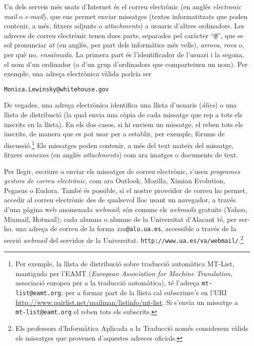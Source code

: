 Un dels serveis més usats d'Internet és el correu
electrònic (en anglés \emph{electronic mail} o \emph{e-mail}),
que ens permet enviar missatges (textos informatitzats que poden
contenir, a més, fitxers adjunts o \emph{attachments}) a usuaris
d'altres ordinadors.  Les adreces de correu electrònic tenen dues
parts, separades pel caràcter ``{\tt @}'', que se sol pronunciar
\emph{at} (en anglés, per part dels informátics més vells), {\em
  arrova}, \emph{rova} o, per què no, \emph{ensa\"{\i}mada}. La
primera part és l'identificador de l'usuari i la segona, el nom
d'un ordinador (o d'un grup d'ordinadors que comparteixen un nom). Per
exemple, una adreça electrònica vàlida podria ser
\begin{center}
{\tt Monica.Lewinsky@whitehouse.gov}
\end{center}
De vegades, una adreça electrònica identifica una llista
d'usuaris (\emph{àlies}) o una llista de distribució (la qual
envia una còpia de cada missatge que rep a tots els inscrits en la
llista). En els dos casos, si hi enviem un missatge, el reben tots els
inscrits, de manera que es pot usar per a establir, per exemple,
fòrums de discussió.\footnote{Per exemple, la llista de
  distribució sobre traducció automàtica MT-List, mantiguda per l'EAMT
  (\emph{European Association for Machine Translation}, associació
  europea per a la traducció automàtica), té l'adreça
  \texttt{mt-list@eamt.org}; per a formar part de la llista cal
  subscriure's en l'URI
  \url{http://www.pairlist.net/mailman/listinfo/mt-list}. Si
  s'envia un missatge a \texttt{mt-list@eamt.org} el reben tots els
  subscrits.}
  \label{pg:annex} Els missatges poden contenir, a més del text mateix
  del missatge, fitxers \emph{annexos} (en anglés {\em
    attachments}) com ara imatges o documents de text.



  Per llegir, escriure o enviar els missatges de correu electrònic, s'usen
  \emph{programes gestors de correu electrònic}, com ara Outlook, Mozilla,
  Ximian Evolution, Pegasus o Eudora.
També és possible, si el nostre proveïdor de correu ho permet, accedir
al correu electrònic des de qualsevol lloc usant un navegador, a
través d'una pàgina web anomenada \emph{webmail}; són comuns els
\emph{webmails} gratuïts (Yahoo, Mixmail, Hotmail); cada alumna o
alumne de la Universitat d'Alacant té, per ser-ho, una adreça de
correu de la forma \emph{xxx}\texttt{@alu.ua.es}, accessible a través de la
secció \emph{webmail} del servidor de la Universitat.
\texttt{http://www.ua.es/va/webmail/}.\footnote{Els professors
  d'Informàtica Aplicada a la Traducció només considerem vàlids els
  missatges que provenen d'aquestes adreces oficials.}

